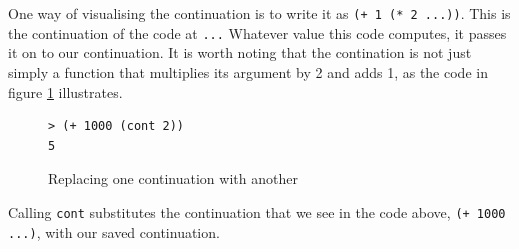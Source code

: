 \documentclass[11pt]{report}
\begin{document}
One way of visualising the continuation is to write it as \texttt{(+ 1 (* 2 ...))}. This is the continuation of the code at \texttt{...} Whatever value this code computes, it passes it on to our continuation. It is worth noting that the contination is not just simply a function that multiplies its argument by 2 and adds 1, as the code in figure \ref{contcc4} illustrates.
\begin{figure}[ht]
\begin{lstlisting}
> (+ 1000 (cont 2))
5
\end{lstlisting}
\caption{Replacing one continuation with another}
\label{contcc4}
\end{figure}

Calling \texttt{cont} substitutes the continuation that we see in the code above, \texttt{(+ 1000 ...)}, with our saved continuation.
\end{document}
